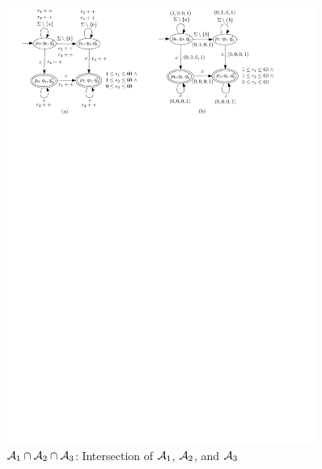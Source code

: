 \begin{figure}[ht]
\vspace{-3mm}
  \centering
  \includegraphics[width = 0.9\textwidth]{sections/overview-cefa-product.pdf}
  \caption{$\mathcal{A}_1 \cap \mathcal{A}_2 \cap \mathcal{A}_3$: Intersection of $\mathcal{A}_1$, $\mathcal{A}_2$, and $\mathcal{A}_3$}
  \label{fig:overview:product}
\vspace{-6mm}
\end{figure}


